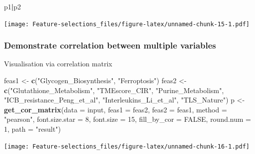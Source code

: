 \documentclass[
  12pt,
]{book}
\newenvironment{Shaded}{\begin{snugshade}}{\end{snugshade}}
\newcommand{\AttributeTok}[1]{\textcolor[rgb]{0.13,0.29,0.53}{#1}}
\newcommand{\ConstantTok}[1]{\textcolor[rgb]{0.56,0.35,0.01}{#1}}
\newcommand{\DecValTok}[1]{\textcolor[rgb]{0.00,0.00,0.81}{#1}}
\newcommand{\FunctionTok}[1]{\textcolor[rgb]{0.13,0.29,0.53}{\textbf{#1}}}
\newcommand{\NormalTok}[1]{#1}
\newcommand{\OtherTok}[1]{\textcolor[rgb]{0.56,0.35,0.01}{#1}}
\newcommand{\SpecialCharTok}[1]{\textcolor[rgb]{0.81,0.36,0.00}{\textbf{#1}}}
\newcommand{\StringTok}[1]{\textcolor[rgb]{0.31,0.60,0.02}{#1}}
\begin{document}
\begin{Shaded}
\begin{Highlighting}[]
\NormalTok{p1}\SpecialCharTok{|}\NormalTok{p2}
\end{Highlighting}
\end{Shaded}

\texttt{[image: Feature-selections\_files/figure-latex/unnamed-chunk-15-1.pdf]}

\hypertarget{demonstrate-correlation-between-multiple-variables}{%
\subsubsection{Demonstrate correlation between multiple variables}\label{demonstrate-correlation-between-multiple-variables}}

Visualisation via correlation matrix

\begin{Shaded}
\begin{Highlighting}[]
\NormalTok{feas1 }\OtherTok{\textless{}{-}} \FunctionTok{c}\NormalTok{(}\StringTok{"Glycogen\_Biosynthesis"}\NormalTok{, }\StringTok{"Ferroptosis"}\NormalTok{)}
\NormalTok{feas2 }\OtherTok{\textless{}{-}} \FunctionTok{c}\NormalTok{(}\StringTok{"Glutathione\_Metabolism"}\NormalTok{, }\StringTok{"TMEscore\_CIR"}\NormalTok{, }\StringTok{"Purine\_Metabolism"}\NormalTok{, }\StringTok{"ICB\_resistance\_Peng\_et\_al"}\NormalTok{, }\StringTok{"Interleukins\_Li\_et\_al"}\NormalTok{, }\StringTok{"TLS\_Nature"}\NormalTok{)}
\NormalTok{p }\OtherTok{\textless{}{-}} \FunctionTok{get\_cor\_matrix}\NormalTok{(}\AttributeTok{data           =}\NormalTok{ input, }
                    \AttributeTok{feas1          =}\NormalTok{ feas2, }
                    \AttributeTok{feas2          =}\NormalTok{ feas1,}
                    \AttributeTok{method         =} \StringTok{"pearson"}\NormalTok{,}
                    \AttributeTok{font.size.star =} \DecValTok{8}\NormalTok{, }
                    \AttributeTok{font.size      =} \DecValTok{15}\NormalTok{, }
                    \AttributeTok{fill\_by\_cor    =} \ConstantTok{FALSE}\NormalTok{, }
                    \AttributeTok{round.num      =} \DecValTok{1}\NormalTok{, }
                    \AttributeTok{path           =} \StringTok{"result"}\NormalTok{)}
\end{Highlighting}
\end{Shaded}

\texttt{[image: Feature-selections\_files/figure-latex/unnamed-chunk-16-1.pdf]}
\end{document}
